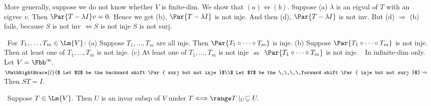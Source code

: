 \vfill
\BulletPointX\NoteForSmall{[5.6]}\TextB{}
More generally, suppose we do not know whether $V$ is finite-dim. We show that $(a)\Longleftrightarrow(b).$\TextB{}
Suppose (a) $\lambda$ is an eigval of $T$ with an eigvec $v.$ Then $\Par{T-\lambda I}v=0.$\TextB{}
Hence we get (b), $\Par{T-\lambda I}$ is not inje. And then (d), $\Par{T-\lambda I}$ is not inv.\TextB{}
But (d) $\Rightarrow$ (b) fails, because $S$ is not inv $\Longleftrightarrow S$ is not inje \OR $S$ is not surj.\par
\SepLine



\BulletPointX\Tips \,\,\,For $T_1,\dots,T_m\in\Lm{V}$:\TextB{\vspace{-2pt}}
(a) Suppose $T_1,\dots,T_m$ are all inje. Then $\Par{T_1\circ\cdots\circ T_m}$ is inje.\TextB{}
(b) Suppose $\Par{T_1\circ\cdots\circ T_m}$ is not inje. Then at least one of $T_1,\dots,T_m$ is not inje.\TextB{}
(c) At least one of $T_1,\dots,T_m$ is not inje $\nRightarrow$ $\Par{T_1\circ\cdots\circ T_m}$ is not inje.\TextB{}
\Hc\Example\,\, In infinite-dim only. Let $V=\Fbb^\infty.$\TextE{}
\;\;\,$\MathRightBrace{l}{$ Let $S$ be the backward shift \Par{ surj but not inje }$\\$ Let $T$ be the \,\,\,\,forward shift \Par{ inje but not surj }$}\Rightarrow$ Then $ST=I.$\PfEnd
\SepLine\pagebreak

\BulletPointX\NoteForSmall{[5.2]}\,\,\,Suppose $T\in\Lm{V}.$ Then $U$ is an invar subsp of $V$ under $T\Longleftrightarrow\range T\mid_U\subseteq U.$
\SepLine

